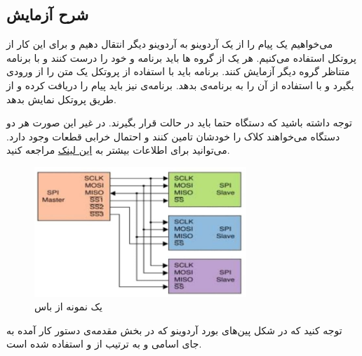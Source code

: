 \subsection{شرح آزمایش}

می‌خواهیم یک پیام را از یک آردوینو به آردوینو دیگر انتقال دهیم و برای این کار از پروتکل  استفاده می‌کنیم.
هر یک از گروه ها باید برنامه  و  خود را درست کنند و با برنامه متناظر گروه دیگر آزمایش کنند.
\newline
برنامه  باید با استفاده از پروتکل  یک متن را از ورودی بگیرد و با استفاده از  آن را به برنامه‌ی  بدهد. برنامه‌ی  نیز باید پیام را دریافت کرده و از طریق پروتکل  نمایش بدهد.

\newline

توجه داشته باشید که دستگاه  حتما باید در حالت  قرار بگیرند. در غیر این صورت هر دو دستگاه می‌خواهند کلاک را خودشان تامین کنند و احتمال خرابی قطعات وجود دارد. می‌توانید برای اطلاعات بیشتر به
\href{https://circuitdigest.com/microcontroller-projects/arduino-spi-communication-tutorial}{این لینک}
مراجعه کنید.

\newline
\begin{figure}[h]
    \centering
    \includegraphics[width=8cm]{SPI_BUS.jpg}
    \caption{یک نمونه از باس }
    \label{fig:spibus}
\end{figure}
\newline

توجه کنید که در شکل پین‌های بورد آردوینو که در بخش مقدمه‌ی دستور کار آمده به جای اسامی  و  به ترتیب از  و  استفاده شده است.